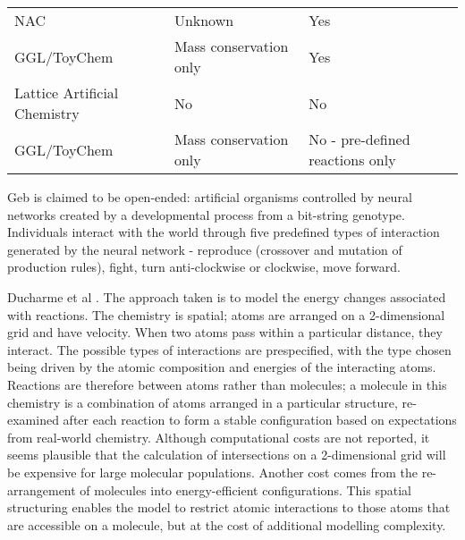\begin{table}
\begin{tabular}{@{}p{4cm}p{4.5cm}p{4.5cm}@{}}
		NAC \parencite{Suzuki2006}                                         & Unknown                                                            & Yes                                      \\						
		GGL/ToyChem \parencite{Benko2005}                                  & Mass conservation only                                             & Yes                                      \\
		Lattice Artificial Chemistry \parencite{Ono2000,Madina2003}        & No                                                                 & No                                       \\
		GGL/ToyChem \parencite{Benko2003}                                  & Mass conservation only                                             & No - pre-defined reactions only          \\
		\hline
	\end{tabular}
\end{table}



Geb \cite{Channon:iw,Channon:2001ly} is claimed to be open-ended: artificial organisms controlled by neural networks created by a developmental process from a bit-string genotype. Individuals interact with the world through five predefined types of interaction generated by the neural network - reproduce (crossover and mutation of production rules), fight, turn anti-clockwise or clockwise, move forward.

Ducharme et al \parencite{Ducharme2012}. The approach taken is to model the energy changes associated with reactions. The chemistry is spatial; atoms are arranged on a 2-dimensional grid and have velocity. When two atoms pass within a particular distance, they interact. The possible types of interactions are prespecified, with the type chosen being driven by the atomic composition and energies of the interacting atoms. Reactions are therefore between atoms rather than molecules; a molecule in this chemistry is a combination of atoms arranged in a particular structure, re-examined after each reaction to form a stable configuration based on expectations from real-world chemistry. Although computational costs are not reported, it seems plausible that the calculation of intersections on a 2-dimensional grid will be expensive for large molecular populations. Another cost comes from the re-arrangement of molecules into energy-efficient configurations. This spatial structuring enables the model to restrict atomic interactions to those atoms that are accessible on a molecule, but at the cost of additional modelling complexity. 


